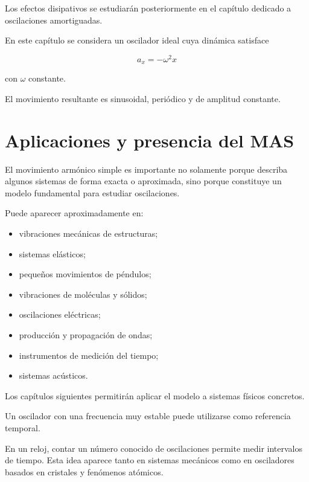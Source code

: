 Los efectos disipativos se estudiarán posteriormente en el capítulo dedicado a oscilaciones amortiguadas.

\begin{modelo}
En este capítulo se considera un oscilador ideal cuya dinámica satisface

\[ a_x=-\omega^2x \]

con \(\omega\) constante.

El movimiento resultante es sinusoidal, periódico y de amplitud constante.
\end{modelo}

\section{Aplicaciones y presencia del MAS}

El movimiento armónico simple es importante no solamente porque describa algunos sistemas de forma exacta o aproximada, sino porque constituye un modelo fundamental para estudiar oscilaciones.

Puede aparecer aproximadamente en:

\begin{itemize}
    \item vibraciones mecánicas de estructuras;
    \item sistemas elásticos;
    \item pequeños movimientos de péndulos;
    \item vibraciones de moléculas y sólidos;
    \item oscilaciones eléctricas;
    \item producción y propagación de ondas;
    \item instrumentos de medición del tiempo;
    \item sistemas acústicos.
\end{itemize}

Los capítulos siguientes permitirán aplicar el modelo a sistemas físicos concretos.

\begin{aplicacion}
Un oscilador con una frecuencia muy estable puede utilizarse como referencia temporal.

En un reloj, contar un número conocido de oscilaciones permite medir intervalos de tiempo. Esta idea aparece tanto en sistemas mecánicos como en osciladores basados en cristales y fenómenos atómicos.
\end{aplicacion}

